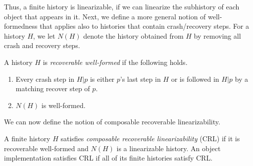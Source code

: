 Thus, a finite history is linearizable, if we can linearize the subhistory of each object that appears in it.
Next, we define a more general notion of well-formedness that applies also to histories that contain crash/recovery steps. For a history $H$, we let $N(H)$ denote the history obtained from $H$ by removing all crash and recovery steps.

\begin{definition} 
\label{def:recoverable-well-formedness}
A history $H$ is \textit{recoverable well-formed} if the following holds.
\begin{enumerate}
\item Every crash step in $H | p$ is either $p$'s last step in $H$ or is followed in $H | p$ by a matching recover step of $p$.
\item $N(H)$ is well-formed.
\end{enumerate}
\end{definition}

We can now define the notion of composable recoverable linearizability.

\begin{definition} 
\label{Definition:CRL}
A finite history $H$ satisfies \emph{composable recoverable linearizability} (CRL) if it is recoverable well-formed and $N(H)$ is a linearizable history.
An object implementation satisfies CRL if all of its finite histories satisfy CRL.
\end{definition}



